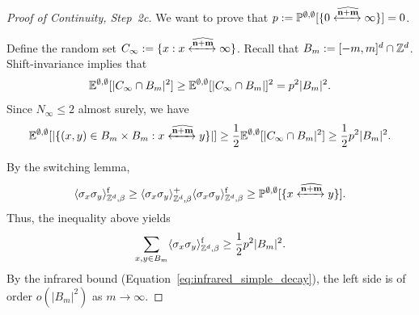 \begin{proof}[Proof of Continuity, Step~2c]
    We want to prove that
    $p:=\mathbb P^{\emptyset,\emptyset}[\{0\xleftrightarrow{\widehat{\mathbf{n}+\mathbf{m}}}\infty\}]=0$.

    Define the random set $C_\infty:=\{x:x\xleftrightarrow{\widehat{\mathbf{n}+\mathbf{m}}}\infty\}$.
    Recall that $B_m:=[-m,m]^d\cap \mathbb Z^d$.
    Shift-invariance implies that
    \[
        \mathbb E^{\emptyset,\emptyset}[|C_\infty\cap B_m|^2]
        \geq
        \mathbb E^{\emptyset,\emptyset}[|C_\infty\cap B_m|]^2
        =
        p^2|B_m|^2.
    \]
    Since $N_\infty\leq 2$ almost surely,
    we have
    \[
        \mathbb E^{\emptyset,\emptyset}[|\{(x,y)\in B_m\times B_m:x\xleftrightarrow{\widehat{\mathbf{n}+\mathbf{m}}}y\}|]
        \geq
        \frac12 \mathbb E^{\emptyset,\emptyset}[|C_\infty\cap B_m|^2]
        \geq
        \frac12 p^2 |B_m|^2.
    \]

    By the switching lemma,
    \[
        \langle\sigma_x\sigma_y\rangle_{\mathbb Z^d,\beta}^{\operatorname{f}}
        \geq
        \langle\sigma_x\sigma_y\rangle_{\mathbb Z^d,\beta}^+
        \langle\sigma_x\sigma_y\rangle_{\mathbb Z^d,\beta}^{\operatorname{f}}
        \geq
        \mathbb P^{\emptyset,\emptyset}[\{x\xleftrightarrow{\widehat{\mathbf{n}+\mathbf{m}}}y\}].
    \]
    Thus, the inequality above yields
    \[
        \sum_{x,y\in B_m}\langle\sigma_x\sigma_y\rangle_{\mathbb Z^d,\beta}^{\operatorname{f}}
        \geq \frac12 p^2 |B_m|^2.
    \]
    By
    the infrared bound (Equation~\eqref{eq:infrared_simple_decay}),
    the left side is of order $o(|B_m|^2)$
    as $m\to\infty$.
\end{proof}
